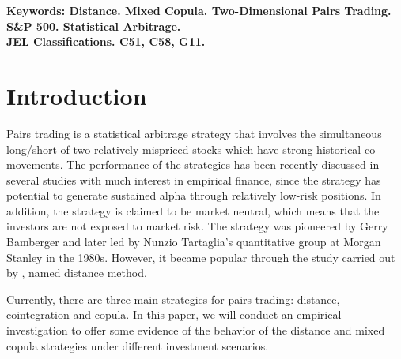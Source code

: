 \documentclass[a4paper,12pt]{report}
\begin{document}
	\noindent \bf Keywords: \rm Distance. Mixed Copula. Two-Dimensional Pairs Trading. S\&P 500. Statistical Arbitrage.\\[.1in]
	\noindent \bf JEL Classifications. \rm C51, C58, G11.
	\clearpage
	
	\setlength{\baselineskip}{12pt}
	
	\setcounter{footnote}{0}
	\clearpage
	
		\section{Introduction}
	Pairs trading is a statistical arbitrage strategy that involves the simultaneous long/short of two relatively mispriced stocks which have strong historical co-movements. The performance of the strategies has been recently discussed in several studies with much interest in empirical finance, since the strategy has potential to generate sustained alpha through relatively low-risk positions. In addition, the strategy is claimed to be market neutral, which means that the investors are not exposed to market risk. The strategy was pioneered by Gerry Bamberger and later led by Nunzio Tartaglia's quantitative group at Morgan Stanley in the 1980s. However, it became popular through the study carried out by \citet*{ggr06}, named distance method.
	
	Currently, there are three main strategies for pairs trading: distance, cointegration and copula. In this paper, we will conduct an empirical investigation to offer some evidence of the behavior of the distance and mixed copula strategies under different investment scenarios. 
	
\end{document}
